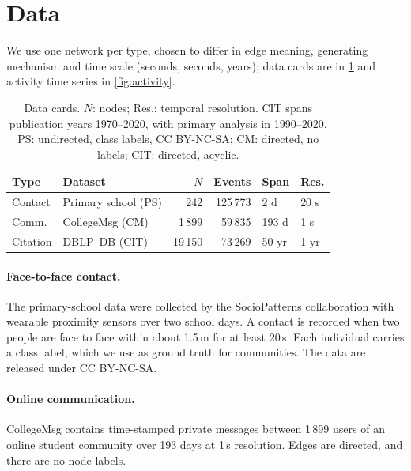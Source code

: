 \section{Data}
\label{sec:data}
We use one network per type, chosen to differ in edge meaning, generating mechanism and time scale (seconds, seconds, years); data cards are in \cref{tab:data} and activity time series in \cref{fig:activity}.

\begin{table}[t]
\centering
\small
\setlength{\tabcolsep}{3pt}
\begin{tabular}{@{}llrrll@{}}
\toprule
Type & Dataset & $N$ & Events & Span & Res. \\
\midrule
Contact & Primary school (PS) & 242 & 125\,773 & 2 d & 20 s \\
Comm. & CollegeMsg (CM) & 1\,899 & 59\,835 & 193 d & 1 s \\
Citation & DBLP--DB (CIT) & 19\,150 & 73\,269 & 50 yr & 1 yr \\
\bottomrule
\end{tabular}
\caption{Data cards. $N$: nodes; Res.: temporal resolution. CIT spans publication years 1970--2020, with primary analysis in 1990--2020. PS: undirected, class labels, CC BY-NC-SA;
CM: directed, no labels; CIT: directed, acyclic.}
\label{tab:data}
\end{table}

\paragraph{Face-to-face contact.}
The primary-school data \citep{stehle2011high,gemmetto2014mitigation} were collected by
the SocioPatterns collaboration with wearable proximity sensors over two school days.
A contact is recorded when two people are face to face within about 1.5\,m for at
least 20\,s. Each individual carries a class label, which we use as ground truth for
communities. The data are released under CC BY-NC-SA.

\paragraph{Online communication.}
CollegeMsg \citep{panzarasa2009patterns} contains time-stamped private messages
between 1\,899 users of an online student community over 193 days at 1\,s
resolution. Edges are directed, and there are no node labels.

